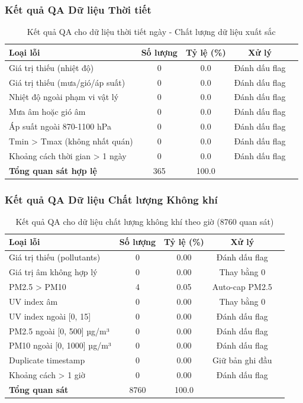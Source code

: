 \documentclass[12pt,a4paper]{article}
\begin{document}
\subsubsection{Kết quả QA Dữ liệu Thời tiết}
\begin{table}[H]
\centering
\begin{tabular}{lcccc}
\toprule
\textbf{Loại lỗi} & \textbf{Số lượng} & \textbf{Tỷ lệ (\%)} & \textbf{Xử lý} \\
\midrule
Giá trị thiếu (nhiệt độ) & 0 & 0.0 & Đánh dấu flag \\
Giá trị thiếu (mưa/gió/áp suất) & 0 & 0.0 & Đánh dấu flag \\
Nhiệt độ ngoài phạm vi vật lý & 0 & 0.0 & Đánh dấu flag \\
Mưa âm hoặc gió âm & 0 & 0.0 & Đánh dấu flag \\
Áp suất ngoài 870-1100 hPa & 0 & 0.0 & Đánh dấu flag \\
Tmin > Tmax (không nhất quán) & 0 & 0.0 & Đánh dấu flag \\
Khoảng cách thời gian > 1 ngày & 0 & 0.0 & Đánh dấu flag \\
\midrule
\textbf{Tổng quan sát hợp lệ} & 365 & 100.0 &  \\
\bottomrule
\end{tabular}
\caption{Kết quả QA cho dữ liệu thời tiết ngày - Chất lượng dữ liệu xuất sắc}
\end{table}

\subsubsection{Kết quả QA Dữ liệu Chất lượng Không khí}
\begin{table}[H]
\centering
\begin{tabular}{lcccc}
\toprule
\textbf{Loại lỗi} & \textbf{Số lượng} & \textbf{Tỷ lệ (\%)} & \textbf{Xử lý} \\
\midrule
Giá trị thiếu (pollutants) & 0 & 0.00 & Đánh dấu flag \\
Giá trị âm không hợp lý & 0 & 0.00 & Thay bằng 0 \\
PM2.5 > PM10 & 4 & 0.05 & Auto-cap PM2.5 \\
UV index âm & 0 & 0.00 & Thay bằng 0 \\
UV index ngoài [0, 15] & 0 & 0.00 & Đánh dấu flag \\
PM2.5 ngoài [0, 500] µg/m³ & 0 & 0.00 & Đánh dấu flag \\
PM10 ngoài [0, 1000] µg/m³ & 0 & 0.00 & Đánh dấu flag \\
Duplicate timestamp & 0 & 0.00 & Giữ bản ghi đầu \\
Khoảng cách > 1 giờ & 0 & 0.00 & Đánh dấu flag \\
\midrule
\textbf{Tổng quan sát} & 8760 & 100.0 & \\
\bottomrule
\end{tabular}
\caption{Kết quả QA cho dữ liệu chất lượng không khí theo giờ (8760 quan sát)}
\end{table}
\end{document}
